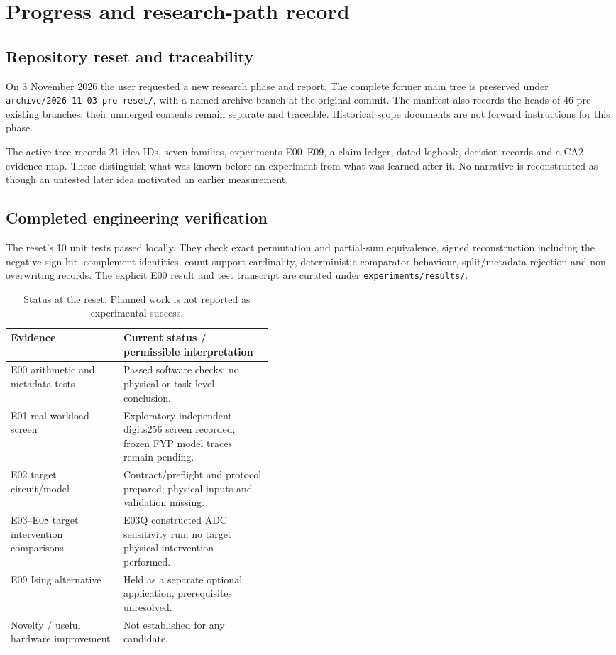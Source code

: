 \section{Progress and research-path record}

\subsection{Repository reset and traceability}

On 3 November 2026 the user requested a new research phase and report. The complete
former main tree is preserved under \texttt{archive/2026-11-03-pre-reset/}, with a named
archive branch at the original commit. The manifest also records the heads of 46
pre-existing branches; their unmerged contents remain separate and traceable.
Historical scope documents are not forward instructions for this phase.

The active tree records 21 idea IDs, seven families, experiments E00--E09, a claim ledger,
dated logbook, decision records and a CA2 evidence map. These distinguish what was known
before an experiment from what was learned after it. No narrative is reconstructed as
though an untested later idea motivated an earlier measurement.

\subsection{Completed engineering verification}

The reset's 10 unit tests passed locally. They check exact permutation and partial-sum
equivalence, signed reconstruction including the negative sign bit, complement identities,
count-support cardinality, deterministic comparator behaviour, split/metadata rejection
and non-overwriting records. The explicit E00 result and test transcript are curated
under \texttt{experiments/results/}.

\begin{table}[htbp]\centering\small
\begin{tabularx}{\linewidth}{@{}p{0.43\linewidth}X@{}}\toprule
Evidence & Current status / permissible interpretation\\\midrule
E00 arithmetic and metadata tests & Passed software checks; no physical or task-level conclusion.\\
E01 real workload screen & Exploratory independent digits256 screen recorded; frozen FYP model traces remain pending.\\
E02 target circuit/model & Contract/preflight and protocol prepared; physical inputs and validation missing.\\
E03--E08 target intervention comparisons & E03Q constructed ADC sensitivity run; no target physical intervention performed.\\
E09 Ising alternative & Held as a separate optional application, prerequisites unresolved.\\
Novelty / useful hardware improvement & Not established for any candidate.\\\bottomrule
\end{tabularx}
\caption{Status at the reset. Planned work is not reported as experimental success.}
\end{table}

